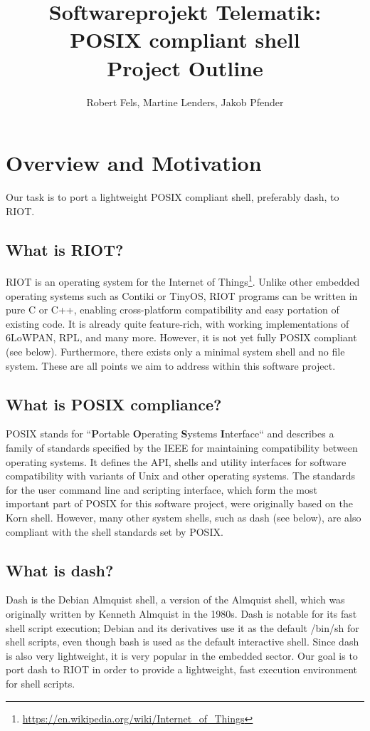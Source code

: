 \documentclass[11pt,
  a4paper,
  BCOR=7mm
]{scrartcl}
\author{Robert Fels, Martine Lenders, Jakob Pfender}
\title{Softwareprojekt Telematik:\\POSIX compliant shell\\Project Outline}
\begin{document}
\maketitle


\section*{Overview and Motivation}
\label{sec:overview_motivation}
Our task is to port a lightweight POSIX compliant shell, preferably
dash, to RIOT.

\subsection*{What is RIOT?}
\label{sub:what_is_riot}
RIOT is an operating system for the Internet of
Things\footnote{\url{https://en.wikipedia.org/wiki/Internet_of_Things}}.
Unlike other embedded operating systems such as Contiki or TinyOS, RIOT
programs can be written in pure C or C++, enabling cross-platform
compatibility and easy portation of existing code. It is already quite
feature-rich, with working implementations of 6LoWPAN, RPL, and many
more. However, it is not yet fully POSIX compliant (see below).
Furthermore, there exists only a minimal system shell and no file
system. These are all points we aim to address within this software
project.

\subsection*{What is POSIX compliance?}
\label{sub:what_is_posix}
POSIX stands for ``\textbf{P}ortable \textbf{O}perating \textbf{S}ystems
\textbf{I}nterface`` and describes a family of standards specified by
the IEEE for maintaining compatibility between operating systems. It
defines the API, shells and utility interfaces for software
compatibility with variants of Unix and other operating systems. The
standards for the user command line and scripting interface, which form
the most important part of POSIX for this software project, were
originally based on the Korn shell. However, many other system shells,
such as dash (see below), are also compliant with the shell standards
set by POSIX.

\subsection*{What is dash?}
\label{sub:what_is_dash}
Dash is the Debian Almquist shell, a version of the Almquist shell,
which was originally written by Kenneth Almquist in the 1980s. Dash is
notable for its fast shell script execution; Debian and its derivatives
use it as the default /bin/sh for shell scripts, even though bash is
used as the default interactive shell. Since dash is also very
lightweight, it is very popular in the embedded sector. Our goal is to
port dash to RIOT in order to provide a lightweight, fast execution
environment for shell scripts.
\end{document}
